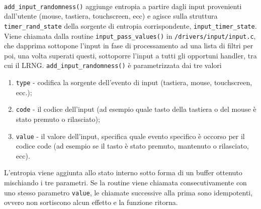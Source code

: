 \documentclass{article}
\begin{document}
 
 \paragraph{} \verb+add_input_randomness()+ aggiunge entropia a partire dagli
 input provenienti dall'utente (mouse, tastiera, touchscreen, ecc) e agisce
 sulla struttura \verb+timer_rand_state+ della sorgente di
 entropia corrispondente, \verb+input_timer_state+. Viene chiamata dalla routine
 \verb+input_pass_values()+ in \verb+/drivers/input/input.c+, che dapprima
 sottopone l'input in fase di processamento ad una lista di filtri per poi, una
 volta superati questi, sottoporre l'input a tutti gli opportuni
 handler, tra cui il LRNG.
 \newline{}\verb+add_input_randomness()+ è parametrizzata dai tre valori
 \begin{enumerate}
   \item \verb+type+ - codifica la sorgente dell'evento di input (tastiera,
   mouse, touchscreen, ecc.);
   \item \verb+code+ - il codice dell'input (ad esempio quale tasto della
   tastiera o del mouse è stato premuto o rilasciato);
   \item \verb+value+ - il valore dell'input, specifica quale evento specifico è
   occorso per il codice code (ad esempio se il tasto è stato premuto,
   mantenuto o rilasciato, ecc).
   \end{enumerate} 
 L'entropia viene aggiunta allo stato interno sotto forma di un buffer
 ottenuto mischiando i tre parametri.
 Se la routine viene chiamata consecutivamente con uno stesso parametro
 \verb+value+, le chiamate successive alla prima sono idempotenti, 
 ovvero non sortiscono alcun effetto e la funzione ritorna.
 
\end{document}
